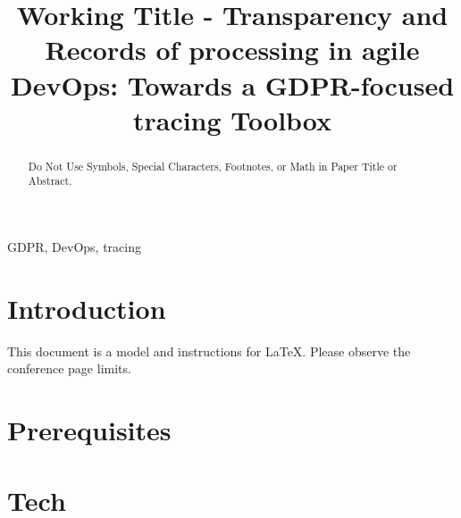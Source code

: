 \documentclass[conference]{IEEEtran}
\begin{document}
\title{Working Title - Transparency and Records of processing in agile DevOps:
Towards a GDPR-focused tracing Toolbox
}


\maketitle


\begin{abstract}
Do Not Use Symbols, Special Characters, Footnotes, or Math in Paper Title or Abstract.
\end{abstract}

\begin{IEEEkeywords}
GDPR, DevOps, tracing
\end{IEEEkeywords}

\section{Introduction}
This document is a model and instructions for \LaTeX.
Please observe the conference page limits. 

\section{Prerequisites}





\section{Tech}


%

\printglossaries


\end{document}
